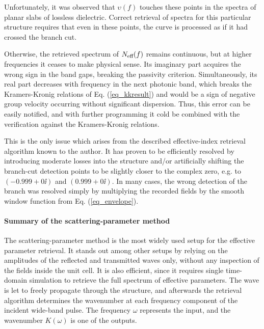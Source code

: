Unfortunately, it was observed that $\upsilon(f)$ touches these points in the spectra of planar slabs of lossless dielectric. Correct retrieval of spectra for this particular structure requires that even in these points, the curve is processed as if it had crossed the branch cut. 

Otherwise, the retrieved spectrum of $N_{\text{eff} }(f)$ remains continuous, but at higher frequencies it ceases to make physical sense. Its imaginary part acquires the wrong sign in the band gaps, breaking the passivity criterion. Simultaneously, its real part decreases with frequency in the next photonic band, which breaks the Kramers-Kronig relations of Eq. (\ref{eq_kkresult}) and would be a sign of negative group velocity occurring without significant dispersion. Thus, this error can be easily notified, and with further programming it cold be combined with the verification against the Kramers-Kronig relations.

This is the only issue which arises from the described effective-index retrieval algorithm known to the author. It has proven to be efficiently resolved by introducing moderate losses into the structure and/or artificially shifting the branch-cut detection points to be slightly closer to the complex zero, e.g. to $(-0.999+0\ii)$ and $(0.999+0\ii)$. In many cases, the wrong detection of the branch was resolved simply by multiplying the recorded fields by the smooth window function from Eq. (\ref{eq_envelope}).

\paragraph{Summary of the scattering-parameter method}%
The scattering-parameter method is the most widely used setup for the effective parameter retrieval. It stands out among other setups by relying on the amplitudes of the reflected and transmitted waves only, without any inspection of the fields inside the unit cell. It is also efficient, since it requires single time-domain simulation to retrieve the full spectrum of effective parameters. The wave is let to freely propagate through the structure, and afterwards the retrieval algorithm determines the wavenumber at each frequency component of the incident wide-band pulse. The frequency $\omega$ represents the input, and the wavenumber $K(\omega)$ is one of the outputs.

